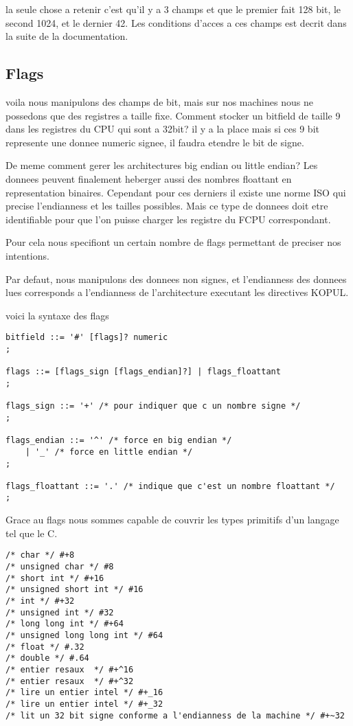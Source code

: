 \documentclass[11pt]{report}
\begin{document}
la seule chose a retenir c'est qu'il y a 3 champs et que le premier fait 128 bit,
le second 1024, et le dernier 42.
Les conditions d'acces a ces champs est decrit dans la suite de la documentation.

\subsection{Flags}
voila nous manipulons des champs de bit, mais sur nos machines nous ne possedons que des registres a taille fixe.
Comment stocker un bitfield de taille 9 dans les registres du CPU qui sont a 32bit?
il y a la place mais si ces 9 bit represente une donnee numeric signee, il faudra etendre le bit de signe. 

De meme comment gerer les architectures big endian ou little endian? 
Les donnees peuvent finalement heberger aussi des nombres floattant en representation binaires. 
Cependant pour ces derniers il existe une norme ISO qui precise l'endianness et les tailles possibles. 
Mais ce type de donnees doit etre identifiable pour que l'on puisse charger les registre du FCPU correspondant.

Pour cela nous specifiont un certain nombre de flags permettant de preciser nos intentions.

Par defaut, nous manipulons des donnees non signes, et l'endianness des donnees lues corresponds a l'endianness de 
l'architecture executant les directives KOPUL.

voici la syntaxe des flags

\begin{lstlisting}
bitfield ::= '#' [flags]? numeric
;

flags ::= [flags_sign [flags_endian]?] | flags_floattant
;

flags_sign ::= '+' /* pour indiquer que c un nombre signe */
;

flags_endian ::= '^' /* force en big endian */
	| '_' /* force en little endian */
;

flags_floattant ::= '.' /* indique que c'est un nombre floattant */
;
\end{lstlisting}

Grace au flags nous sommes capable de couvrir les types primitifs d'un langage
tel que le C.

\begin{lstlisting}
/* char */ #+8
/* unsigned char */ #8
/* short int */ #+16
/* unsigned short int */ #16
/* int */ #+32
/* unsigned int */ #32
/* long long int */ #+64
/* unsigned long long int */ #64
/* float */ #.32
/* double */ #.64
/* entier resaux  */ #+^16
/* entier resaux  */ #+^32
/* lire un entier intel */ #+_16
/* lire un entier intel */ #+_32
/* lit un 32 bit signe conforme a l'endianness de la machine */ #+~32
\end{lstlisting}
\end{document}
